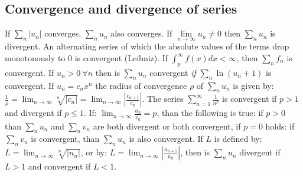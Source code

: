 \documentclass[twoside]{report}
\begin{document}
\subsection{Convergence and divergence of series}
If $\sum\limits_n|u_n|$ converges, $\sum\limits_n u_n$ also converges.
\npar
If $\lim\limits_{n\rightarrow\infty}u_n\neq0$ then $\sum\limits_n u_n$ is divergent.
\npar
An alternating series of which the absolute values of the terms drop
monotonously to 0 is convergent (Leibniz).
\npar
If $\int_p^{\infty}f(x)dx<\infty$, then $\sum\limits_n f_n$ is convergent.
\npar
If $u_n>0~\forall n$ then is $\sum\limits_n u_n$ convergent {\it if}
$\sum\limits_n\ln(u_n+1)$ is convergent.
\npar
If $u_n=c_nx^n$ the radius of convergence $\rho$ of
$\sum\limits_n u_n$ is given by:
$\displaystyle\frac{1}{\rho}=\lim_{n\rightarrow\infty}\sqrt[n]{|c_n|}=
\lim_{n\rightarrow\infty}\left|\frac{c_{n+1}}{c_n}\right|$.
\npar
The series $\displaystyle\sum_{n=1}^\infty \frac{1}{n^p}$ is convergent if
$p>1$ and divergent if $p\leq1$.
\npar
If: $\displaystyle\lim_{n\rightarrow\infty}\frac{u_n}{v_n}=p$,
than the following is true: if $p>0$ than $\sum\limits_{n}u_n$ and $\sum\limits_{n}v_n$
are both divergent or both convergent, if $p=0$ holds: if $\sum\limits_{n}v_n$
is convergent, than $\sum\limits_{n}u_n$ is also convergent.
\npar
If $L$ is defined by:
$\displaystyle L=\lim_{n\rightarrow\infty}\sqrt[n]{|n_n|}$, or by:
$\displaystyle L=\lim_{n\rightarrow\infty}\left|\frac{u_{n+1}}{u_n}\right|$,
then is $\sum\limits_{n}u_n$ divergent if $L>1$ and convergent if $L<1$.
\end{document}
